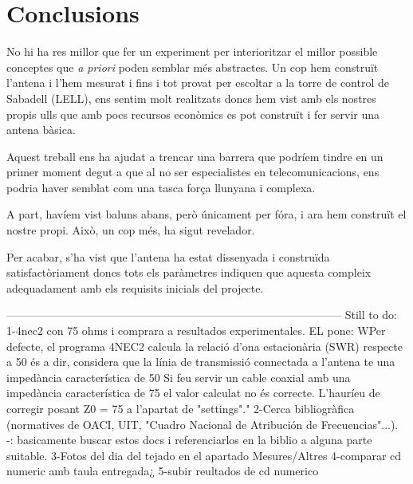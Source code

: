 \chapter{Conclusions}

No hi ha res millor que fer un experiment per interioritzar el millor possible conceptes que \textit{a priori} poden semblar més abstractes. Un cop hem construït l'antena i l'hem mesurat i fins i tot provat per escoltar a la torre de control de Sabadell (LELL), ens sentim molt realitzats doncs hem vist amb els nostres propis ulls que amb pocs recursos econòmics es pot construït i fer servir una antena bàsica.

Aquest treball ens ha ajudat a trencar una barrera que podríem tindre en un primer moment degut a que al no ser especialistes en telecomunicacions, ens podria haver semblat com una tasca força llunyana i complexa.

A part, havíem vist baluns abans, però únicament per fóra, i ara hem construït el nostre propi. Això, un cop més, ha sigut revelador. 

Per acabar, s'ha vist que l'antena ha estat dissenyada i construïda satisfactòriament doncs tots els paràmetres indiquen que aquesta compleix adequadament amb els requisits inicials del projecte.

------------------------------------------------------------------------------------------
Still to do:
1-4nec2 con 75 ohms i comprara a resultados experimentales. EL pone:
WPer defecte, el programa 4NEC2 calcula la relació d'ona estacionària (SWR) respecte a
50  és a dir, considera que la línia de transmissió connectada a l'antena te una
impedància característica de 50 Si feu servir un cable coaxial amb una impedància
característica de 75 el valor calculat no és correcte. L'hauríeu de corregir posant Z0 =
75 a l'apartat de "settings"."
2-Cerca bibliogràfica (normatives de OACI, UIT, "Cuadro Nacional de Atribución de
Frecuencias"...). -: basicamente buscar estos docs i referenciarlos en la biblio a alguna parte suitable.
3-Fotos del dia del tejado en el apartado Mesures/Altres
4-comparar cd numeric amb taula entregada¿
5-subir reultados de cd numerico